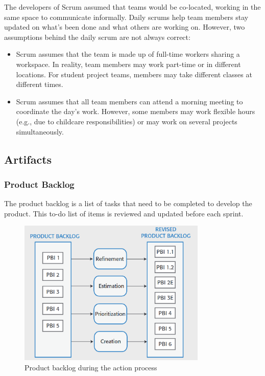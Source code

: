 The developers of Scrum assumed that teams would be co-located, working in the same space to communicate informally. Daily scrums help team members stay updated on what’s been done and what others are working on. However, two assumptions behind the daily scrum are not always correct: 
\begin{itemize}
    \item Scrum assumes that the team is made up of full-time workers sharing a workspace. In reality, team members may work part-time or in different locations. For student project teams, members may take different classes at different times.
    \item Scrum assumes that all team members can attend a morning meeting to coordinate the day’s work. However, some members may work flexible hours (e.g., due to childcare responsibilities) or may work on several projects simultaneously.
\end{itemize}

\subsection{Artifacts}

\subsubsection{Product Backlog}

The product backlog is a list of tasks that need to be completed to develop the product. This to-do list of items is reviewed and updated before each sprint.

\begin{figure} [H]
    \centering
    \includegraphics[width=0.8\textwidth]{images/Agile/ProductBacklog.png}
    \caption{Product backlog during the action process}
    \label{fig:productbacklog}
\end{figure} 

